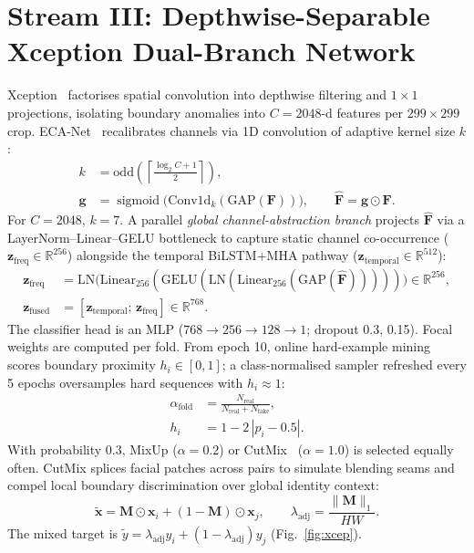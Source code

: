 \documentclass[runningheads]{llncs}
\newcommand{\R}{\mathbb{R}}
\newcommand{\bx}{\mathbf{x}}
\newcommand{\bz}{\mathbf{z}}
\newcommand{\bF}{\mathbf{F}}
\DeclareMathOperator{\sigm}{sigmoid}
\begin{document}
\section{Stream III: Depthwise-Separable Xception Dual-Branch Network}
Xception~\cite{chollet2017xception} factorises spatial convolution into depthwise filtering and $1{\times}1$ projections, isolating boundary anomalies into $C{=}2048$-d features per $299{\times}299$ crop. ECA-Net~\cite{wang2020eca} recalibrates channels via 1D convolution of adaptive kernel size $k$:
\begin{align}
k&=\mathrm{odd}\!\left(\left\lceil\frac{\log_2 C+1}{2}\right\rceil\right),\\
\mathbf g&=\sigm\!\bigl(\mathrm{Conv1d}_k(\mathrm{GAP}(\bF))\bigr),\qquad \hat{\bF}=\mathbf g\odot\bF .
\end{align}
For $C{=}2048$, $k{=}7$. A parallel \emph{global channel-abstraction branch} projects $\hat{\bF}$ via a LayerNorm--Linear--GELU bottleneck to capture static channel co-occurrence ($\bz_{\mathrm{freq}}\in\R^{256}$) alongside the temporal BiLSTM+MHA pathway ($\bz_{\mathrm{temporal}}\in\R^{512}$):
\begin{align}
\bz_{\mathrm{freq}}&=\mathrm{LN}\bigl(\mathrm{Linear}_{256}(\mathrm{GELU}(\mathrm{LN}(\mathrm{Linear}_{256}(\mathrm{GAP}(\hat{\bF})))))\bigr)\in\R^{256},\\
\bz_{\mathrm{fused}}&=[\bz_{\mathrm{temporal}};\,\bz_{\mathrm{freq}}]\in\R^{768}.
\end{align}
The classifier head is an MLP ($768{\to}256{\to}128{\to}1$; dropout 0.3, 0.15). Focal weights are computed per fold. From epoch 10, online hard-example mining~\cite{shrivastava2016ohem} scores boundary proximity $h_i\in[0,1]$; a class-normalised sampler refreshed every 5 epochs oversamples hard sequences with $h_i\approx1$:
\begin{align}
\alpha_{\mathrm{fold}}&=\frac{N_{\mathrm{real}}}{N_{\mathrm{real}}+N_{\mathrm{fake}}},\\
h_i&=1-2\,|p_i-0.5|.
\end{align}
With probability 0.3, MixUp ($\alpha{=}0.2$) or CutMix~\cite{yun2019cutmix} ($\alpha{=}1.0$) is selected equally often. CutMix splices facial patches across pairs to simulate blending seams and compel local boundary discrimination over global identity context:
\begin{equation}
\tilde{\bx}=\mathbf M\odot\bx_i+(1-\mathbf M)\odot\bx_j,\qquad \lambda_{\mathrm{adj}}=\frac{\|\mathbf M\|_1}{HW}.
\end{equation}
The mixed target is $\tilde y=\lambda_{\mathrm{adj}}y_i+(1-\lambda_{\mathrm{adj}})y_j$ (Fig.~\ref{fig:xcep}).
\end{document}
